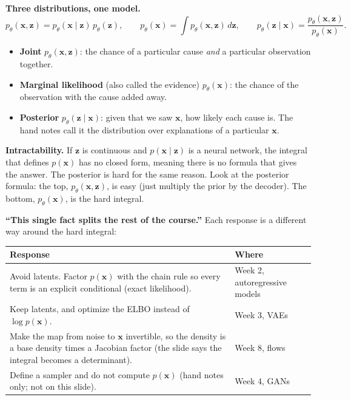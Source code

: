 \textbf{Three distributions, one model.}
\[
p_\theta(\mathbf{x},\mathbf{z})=p_\theta(\mathbf{x}\mid\mathbf{z})\,p_\theta(\mathbf{z}),\qquad
p_\theta(\mathbf{x})=\int p_\theta(\mathbf{x},\mathbf{z})\,d\mathbf{z},\qquad
p_\theta(\mathbf{z}\mid\mathbf{x})=\frac{p_\theta(\mathbf{x},\mathbf{z})}{p_\theta(\mathbf{x})}.
\]
\begin{itemize}
\item \textbf{Joint} $p_\theta(\mathbf{x},\mathbf{z})$: the chance of a particular cause \textit{and} a particular observation together.
\item \textbf{Marginal likelihood} (also called the evidence) $p_\theta(\mathbf{x})$: the chance of the observation with the cause added away.
\item \textbf{Posterior} $p_\theta(\mathbf{z}\mid\mathbf{x})$: given that we saw $\mathbf{x}$, how likely each cause is. The hand notes call it the distribution over explanations of a particular $\mathbf{x}$.
\end{itemize}

\textbf{Intractability.} If $\mathbf{z}$ is continuous and $p(\mathbf{x}\mid\mathbf{z})$ is a neural network, the integral that defines $p(\mathbf{x})$ has no closed form, meaning there is no formula that gives the answer. The posterior is hard for the same reason. Look at the posterior formula: the top, $p_\theta(\mathbf{x},\mathbf{z})$, is easy (just multiply the prior by the decoder). The bottom, $p_\theta(\mathbf{x})$, is the hard integral.

\textbf{``This single fact splits the rest of the course.''} Each response is a different way around the hard integral:

\begin{center}
\begin{tabular}{p{}p{}}
\toprule
Response & Where \\
\midrule
Avoid latents. Factor $p(\mathbf{x})$ with the chain rule so every term is an explicit conditional (exact likelihood). & Week 2, autoregressive models \\ \addlinespace
Keep latents, and optimize the ELBO instead of $\log p(\mathbf{x})$. & Week 3, VAEs \\ \addlinespace
Make the map from noise to $\mathbf{x}$ invertible, so the density is a base density times a Jacobian factor (the slide says the integral becomes a determinant). & Week 8, flows \\ \addlinespace
Define a sampler and do not compute $p(\mathbf{x})$ (hand notes only; not on this slide). & Week 4, GANs \\
\bottomrule
\end{tabular}
\end{center}

